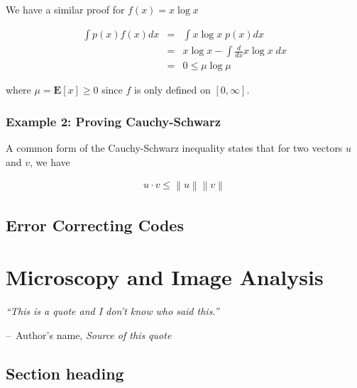 \documentclass[a4paper,11pt]{book}
\makeatletter
\newenvironment{chapquote}[2][2em]
  {\setlength{\@tempdima}{#1}%
   \def\chapquote@author{#2}%
   \parshape 1 \@tempdima \dimexpr\textwidth-2\@tempdima\relax%
   \itshape}
  {\par\normalfont\hfill--\ \chapquote@author\hspace*{\@tempdima}\par\bigskip}
\makeatother
\begin{document}
We have a similar proof for $f(x) = x\log x$

\begin{eqnarray*}
\int p(x)f(x)dx & = & \int x\log x\; p(x)dx\\
&=& x\log x - \int \frac{d}{dx}x\log x\;dx\\
&=& 0 \leq \mu \log \mu
\end{eqnarray*}

where $\mu = \mathbf{E}[x] \geq 0$ since $f$ is only defined on $[0, \infty]$.

\subsection{Example 2: Proving Cauchy-Schwarz}

A common form of the Cauchy-Schwarz inequality states that for two vectors $u$ and $v$, we have

\newcommand\norm[1]{\left\lVert#1\right\rVert}
\begin{eqnarray*}
u \cdot v  \leq \norm{u}\norm{v}
\end{eqnarray*}

\section{Error Correcting Codes}

\chapter{Microscopy and Image Analysis}

\begin{chapquote}{Author's name, \textit{Source of this quote}}
``This is a quote and I don't know who said this.''
\end{chapquote}

\section{Section heading}
\end{document}
